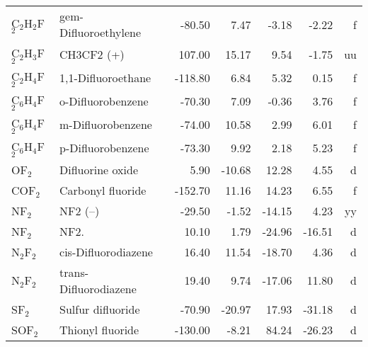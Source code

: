 \begin{table}
\begin{center}
\begin{tabular}{llrrrrr}
 C$_2$H$_2$F$_2$      & gem-Difluoroethylene            &   -80.50    &     7.47  &    -3.18  &    -2.22  &      f\\
 C$_2$H$_3$F$_2$      & CH3CF2 (+)                      &   107.00    &    15.17  &     9.54  &    -1.75  &     uu\\
 C$_2$H$_4$F$_2$      & 1,1-Difluoroethane              &  -118.80    &     6.84  &     5.32  &     0.15  &      f\\
 C$_6$H$_4$F$_2$      & o-Difluorobenzene               &   -70.30    &     7.09  &    -0.36  &     3.76  &      f\\
 C$_6$H$_4$F$_2$      & m-Difluorobenzene               &   -74.00    &    10.58  &     2.99  &     6.01  &      f\\
 C$_6$H$_4$F$_2$      & p-Difluorobenzene               &   -73.30    &     9.92  &     2.18  &     5.23  &      f\\
 OF$_2$         & Difluorine oxide                &     5.90    &   -10.68  &    12.28  &     4.55  &      d\\
 COF$_2$        & Carbonyl fluoride               &  -152.70    &    11.16  &    14.23  &     6.55  &      f\\
 NF$_2$         & NF2 (--)                         &   -29.50    &    -1.52  &   -14.15  &     4.23  &     yy\\
 NF$_2$         & NF2.                            &    10.10    &     1.79  &   -24.96  &   -16.51  &      d\\
 N$_2$F$_2$        & cis-Difluorodiazene             &    16.40    &    11.54  &   -18.70  &     4.36  &      d\\
 N$_2$F$_2$        & trans-Difluorodiazene           &    19.40    &     9.74  &   -17.06  &    11.80  &      d\\
 SF$_2$         & Sulfur difluoride               &   -70.90    &   -20.97  &    17.93  &   -31.18  &      d\\
 SOF$_2$        & Thionyl fluoride                &  -130.00    &    -8.21  &    84.24  &   -26.23  &      d\\
\hline
\end{tabular}
\end{center}
\end{table}
\clearpage

